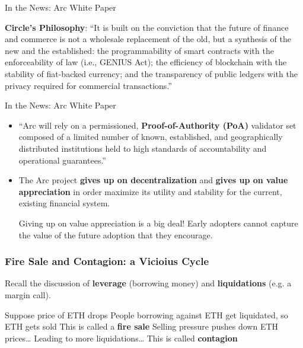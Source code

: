 \documentclass[]{beamer}
\begin{document}
\begin{frame}{In the News: Arc White Paper}

\textbf{Circle's Philosophy}: ``It is built on the conviction that the future of finance and commerce is not a wholesale replacement of the old, but a synthesis of the new and the established: the programmability of smart contracts with the enforceability of law (i.e., GENIUS Act); the efficiency of blockchain with the stability of fiat-backed currency; and the transparency of public ledgers with the privacy required for commercial transactions.'' 
    
\end{frame}

\begin{frame}{In the News: Arc White Paper}

\begin{itemize}

\item ``Arc will rely on a permissioned, \textbf{Proof-of-Authority (PoA)} validator set composed of a limited number of known, established, and geographically distributed institutions held to high standards of accountability and operational guarantees.''

\item The Arc project \textbf{gives up on decentralization} and \textbf{gives up on value appreciation} in order maximize its utility and stability for the current, existing financial system. 

\m Giving up on value appreciation is a big deal! Early adopters cannot capture the value of the future adoption that they encourage. 
\end{itemize}
    
\end{frame}






\begin{frame}
\frametitle{Fire Sale and Contagion: a Vicioius Cycle}

Recall the discussion of \textbf{leverage} (borrowing money) and \textbf{liquidations} (e.g. a margin call). 

\bi
\m Suppose price of ETH drops
\m People borrowing against ETH get liquidated, so ETH gets sold
\bi 
\m This is called a \textbf{fire sale}
\ei 
\m Selling pressure pushes down ETH prices\ldots
\m Leading to more liquidations\ldots 
\bi 
\m This is called \textbf{contagion}
\ei 
\ei

\end{frame}
\end{document}
